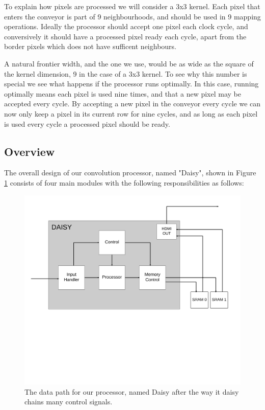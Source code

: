 To explain how pixels are processed we will consider a 3x3 kernel.
Each pixel that enters the conveyor is part of 9 neighbourhoods, and should be used in 9 mapping operations.
Ideally the processor should accept one pixel each clock cycle, and conversively it should have a processed pixel ready each cycle, apart from the border pixels which does not have sufficent neighbours.


A natural frontier width, and the one we use, would be as wide as the square of the kernel dimension, 9 in the case of a 3x3 kernel.
To see why this number is special we see what happens if the processor runs optimally.
In this case, running optimally means each pixel is used nine times, and that a new pixel may be accepted every cycle.
By accepting a new pixel in the conveyor every cycle we can now only keep a pixel in its current row for nine cycles, and as long as each pixel is used every cycle a processed pixel should be ready.

\subsection{Overview}
The overall design of our convolution processor, named "Daisy", shown in Figure \ref{fig:Convolution} consists of four main modules with the following responsibilities as follows:
\begin{figure}[h!]
    \includegraphics[width=\linewidth]{img/daisy_overview.png}
    \caption{The data path for our processor, named Daisy after the way it daisy chains many control signals.}
    \label{fig:Convolution}
\end{figure}

